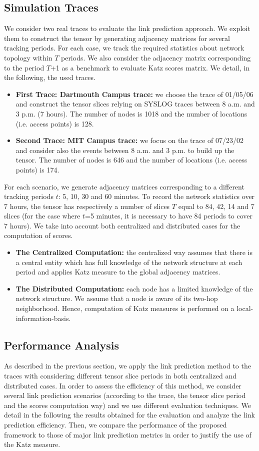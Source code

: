 \documentclass[conference]{IEEEtran}
\begin{document}
\subsection{Simulation Traces}
We consider two real traces to evaluate the link prediction
approach. We exploit them to construct the tensor by generating
adjacency matrices for several tracking periods. For each case, we
track the required statistics about network topology within $T$
periods. We also consider the adjacency matrix corresponding to the
period $T$+1 as a benchmark to evaluate Katz scores matrix. We
detail, in the following, the used traces.
\begin{itemize}
\item \textbf{First Trace: Dartmouth Campus trace:}
we choose the trace of 01/05/06 \cite{Dartmouth} and construct the
tensor slices relying on SYSLOG traces between 8 a.m. and 3 p.m. (7
hours). The number of nodes is 1018 and the number of locations
(i.e. access points) is 128.
\item \textbf{Second Trace: MIT Campus trace:}
we focus on the trace of 07/23/02 \cite{Balazinska2003} and consider
also the events between 8 a.m. and 3 p.m. to build up the tensor.
The number of nodes is 646 and the number of locations (i.e. access
points) is 174.
\end{itemize}
For each scenario, we generate adjacency matrices corresponding to a
different tracking periods $t$: 5, 10, 30 and 60 minutes. To record
the network statistics over 7 hours, the tensor has respectively a
number of slices $T$ equal to 84, 42, 14 and 7 slices (for the case
where $t$=5 minutes, it is necessary to have 84 periods to cover 7
hours). We take into account both centralized and distributed cases
for the computation of scores.
\begin{itemize}
\item \textbf{The Centralized Computation:}
the centralized way assumes that there is a central entity which has
full knowledge of the network structure at each period and applies
Katz measure to the global adjacency matrices.
\item \textbf{The Distributed Computation:}
each node has a limited knowledge of the network structure. We
assume that a node is aware of its two-hop neighborhood. Hence,
computation of Katz measures is performed on a
local-information-basis.
\end{itemize}

\subsection{Performance Analysis}
As described in the previous section, we apply the link prediction
method to the traces with considering different tensor slice periods
in both centralized and distributed cases. In order to assess the
efficiency of this method, we consider several link prediction
scenarios (according to the trace, the tensor slice period and the
scores computation way) and we use different evaluation techniques.
We detail in the following the results obtained for the evaluation
and analyze the link prediction efficiency. Then, we compare the
performance of the proposed framework to those of major link
prediction metrics in order to justify the use of the Katz measure.
\end{document}
